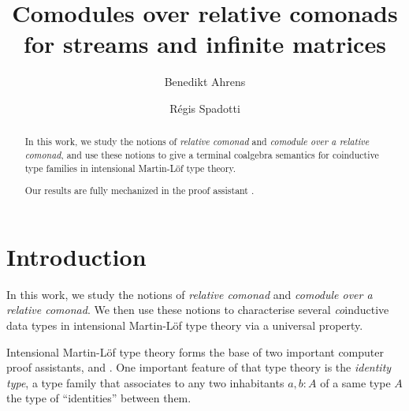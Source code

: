 \documentclass{amsart}
\author{Benedikt Ahrens}
\author{R\'egis Spadotti}
\title[Comodules over relative comonads]{Comodules over relative comonads \\ for streams and infinite matrices}
\begin{document}
\begin{abstract}


 In this work, we study the notions of \emph{relative comonad} and \emph{comodule over a relative comonad}, and  
 use these notions to give a terminal coalgebra semantics for coinductive type families in 
 intensional Martin-L\"of type theory.
 
    
  
  

%   
  
  Our results are fully mechanized in the proof assistant \coq.
  \end{abstract}

\maketitle

\tableofcontents

\section{Introduction}
 
 In this work, we study the notions of \emph{relative comonad} and \emph{comodule over a relative comonad}.
 We then use these notions to characterise several \emph{co}inductive data types in intensional Martin-L\"of type theory
 via a universal property.
 
 Intensional Martin-L\"of type theory \parencite{martin_lof} forms the base of two important computer proof assistants, \coq and \agda.
 One important feature of that type theory is the \emph{identity type}, a type family that associates to any two 
 inhabitants $a,b : A$ of a same type $A$ the type of \enquote{identities} between them.
 
\end{document}
